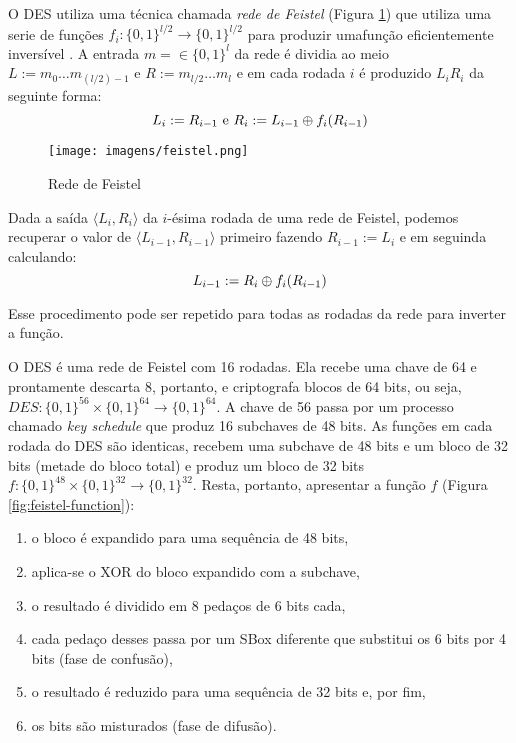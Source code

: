 O DES utiliza uma técnica chamada {\em rede de Feistel} (Figura \ref{fig:feistel}) que utiliza uma serie de funções $f_i:\{0,1\}^{l/2} \to \{0,1\}^{l/2}$ para produzir umafunção eficientemente inversível \cite{Feistel73}.
A entrada $m = \in \{0,1\}^l$ da rede é dividia ao meio $L := m_0 \dots m_{(l/2)-1}$ e $R := m_{l/2} \dots m_l$ e em cada rodada $i$ é produzido $L_iR_i$ da seguinte forma:
\begin{displaymath}
  L_i := R_{i-1} \textrm{ e } R_i := L_{i-1} \oplus f_i(R_{i-1})
\end{displaymath}


\begin{figure}[htbp]
  \centering
  \texttt{[image: imagens/feistel.png]}
  \caption{Rede de Feistel}
  \label{fig:feistel}
\end{figure}

Dada a saída $\langle L_i, R_i \rangle$ da $i$-ésima rodada de uma rede de Feistel, podemos recuperar o valor de $\langle L_{i-1}, R_{i-1} \rangle$ primeiro fazendo $R_{i-1} := L_i$ e em seguinda calculando:
\begin{displaymath}
  L_{i-1} := R_i \oplus f_i(R_{i-1})
\end{displaymath}

Esse procedimento pode ser repetido para todas as rodadas da rede para inverter a função.

O DES é uma rede de Feistel com 16 rodadas.
Ela recebe uma chave de 64 e prontamente descarta 8, portanto, e criptografa blocos de 64 bits, ou seja, $DES: \{0,1\}^{56} \times \{0,1\}^{64} \to \{0,1\}^{64}$.
A chave de 56 passa por um processo chamado {\em key schedule} que produz 16 subchaves de 48 bits.
As funções em cada rodada do DES são identicas, recebem uma subchave de 48 bits e um bloco de 32 bits (metade do bloco total) e produz um bloco de 32 bits $f: \{0,1\}^{48} \times \{0,1\}^{32} \to \{0,1\}^{32}$.
Resta, portanto, apresentar a função $f$ (Figura \ref{fig:feistel-function}):
\begin{enumerate}
\item o bloco é expandido para uma sequência de 48 bits,
\item aplica-se o XOR do bloco expandido com a subchave,
\item o resultado é dividido em 8 pedaços de 6 bits cada,
\item cada pedaço desses passa por um SBox diferente que substitui os 6 bits por 4 bits (fase de confusão),
\item o resultado é reduzido para uma sequência de 32 bits e, por fim,
\item os bits são misturados (fase de difusão).
\end{enumerate}

